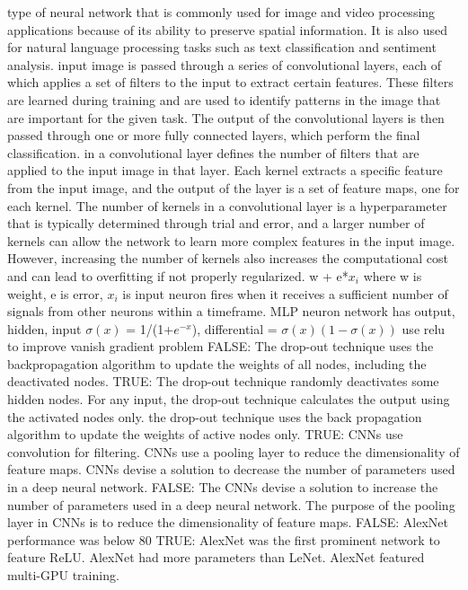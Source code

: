 \documentclass[10pt]{article}
\begin{document}
\smallbreak
{} type of neural network that is commonly used for image and video processing applications because of its ability to preserve spatial information. It is also used for natural language processing tasks such as text classification and sentiment analysis.
\NEW   input image is passed through a series of convolutional layers, each of which applies a set of filters to the input to extract certain features. These filters are learned during training and are used to identify patterns in the image that are important for the given task. The output of the convolutional layers is then passed through one or more fully connected layers, which perform the final classification.
  in a convolutional layer defines the number of filters that are applied to the input image in that layer. Each kernel extracts a specific feature from the input image, and the output of the layer is a set of feature maps, one for each kernel. The number of kernels in a convolutional layer is a hyperparameter that is typically determined through trial and error, and a larger number of kernels can allow the network to learn more complex features in the input image. However, increasing the number of kernels also increases the computational cost and can lead to overfitting if not properly regularized.
\NEW    w + e*$x_i$ where w is weight, e is error, $x_i$ is input
\NEW neuron fires when it receives a sufficient number of signals from other neurons within a timeframe.
\NEW MLP neuron network has output, hidden, input
\NEW $\sigma(x)$ = 1/(1+$e^{-x}$), differential = $\sigma(x)(1-\sigma(x))$
\NEW use relu to improve vanish gradient problem
\NEW FALSE: The drop-out technique uses the backpropagation algorithm to update the weights of all nodes, including the deactivated nodes.
\NEW TRUE: The drop-out technique randomly deactivates some hidden nodes. For any input, the drop-out technique calculates the output using the activated nodes only. the drop-out technique uses the back propagation algorithm to update the weights of active nodes only.
\NEW TRUE: CNNs use convolution for filtering. CNNs use a pooling layer to reduce the dimensionality of feature maps.  CNNs devise a solution to decrease the number of parameters used in a deep neural network.
\NEW FALSE: The CNNs devise a solution to increase the number of parameters used in a deep neural network.
\NEW The purpose of the pooling layer in CNNs is to reduce the dimensionality of feature maps.
\NEW FALSE: AlexNet performance was below 80%
\NEW TRUE: AlexNet was the first prominent network to feature ReLU. AlexNet had more parameters than LeNet. AlexNet featured multi-GPU training.
\end{document}
